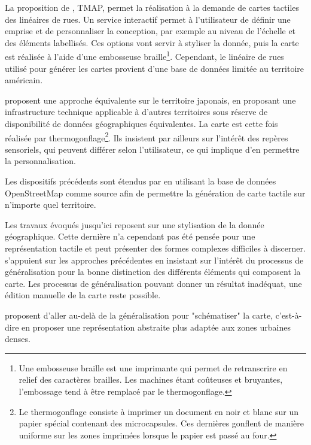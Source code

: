La proposition de \cite{Miele2004}, TMAP, permet la réalisation à la demande de cartes tactiles des linéaires de rues. Un service interactif permet à l'utilisateur de définir une emprise et de personnaliser la conception, par exemple au niveau de l'échelle et des éléments labellisés. Ces options vont servir à styliser la donnée, puis la carte est réalisée à l'aide d'une embosseuse braille\footnote{Une embosseuse braille est une imprimante qui permet de retranscrire en relief des caractères brailles. Les machines étant coûteuses et bruyantes, l'embossage tend à être remplacé par le thermogonflage.}. Cependant, le linéaire de rues utilisé pour générer les cartes provient d'une base de données limitée au territoire américain. 

\cite{Minatani2010} proposent une approche équivalente sur le territoire japonais, en proposant une infrastructure technique applicable à d'autres territoires sous réserve de disponibilité de données géographiques équivalentes. La carte est cette fois réalisée par thermogonflage\footnote{Le thermogonflage consiste à imprimer un document en noir et blanc sur un papier spécial contenant des microcapsules. Ces dernières gonflent de manière uniforme sur les zones imprimées lorsque le papier est passé au four.}. Ils insistent par ailleurs sur l'intérêt des repères sensoriels, qui peuvent différer selon l'utilisateur, ce qui implique d'en permettre la personnalisation. 

Les dispositifs précédents sont étendus par \cite{Watanabe2014, Cervenka2016} en utilisant la base de données OpenStreetMap comme source afin de permettre la génération de carte tactile sur n'importe quel territoire.

\newpar{}

Les travaux évoqués jusqu'ici reposent sur une stylisation de la donnée géographique. Cette dernière n'a cependant pas été pensée pour une représentation tactile et peut présenter des formes complexes difficiles à discerner. \cite{Stampach2016} s'appuient sur les approches précédentes en insistant sur l’intérêt du processus de généralisation pour la bonne distinction des différents éléments qui composent la carte. Les processus de généralisation pouvant donner un résultat inadéquat, une édition manuelle de la carte reste possible.

\cite{Touya2019} proposent d'aller au-delà de la généralisation pour "schématiser" la carte, c'est-à-dire en proposer une représentation abstraite plus adaptée aux zones urbaines denses. 

